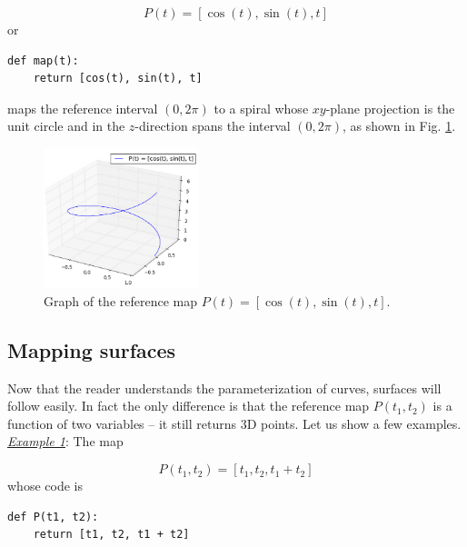 $$
P(t) = [\cos(t), \sin(t), t]
$$
or\\

\begin{bbox}
\begin{verbatim}
def map(t):
    return [cos(t), sin(t), t]
\end{verbatim}
\end{bbox}
\vspace{6mm}

\noindent
maps the reference interval $(0, 2\pi)$ to a spiral whose 
$xy$-plane projection is the unit circle and in the $z$-direction 
spans the interval $(0, 2\pi)$, as shown in Fig. \ref{fig:paramcu4}.

\begin{figure}[!ht]
\begin{center}
\includegraphics[width=0.4\textwidth]{img/paramcu4.png}
\end{center}
\vspace{-6mm}
\caption{Graph of the reference map $P(t) = [\cos(t), \sin(t), t]$.}
\label{fig:paramcu4}
\end{figure}
\noindent

\subsection{Mapping surfaces}

Now that the reader understands the parameterization of curves, surfaces will 
follow easily. In fact the only difference is that the reference map 
$P(t_1, t_2)$ is a function of two variables -- it still returns 3D points. 
Let us show a few examples.\\

\noindent
\underline{\em Example 1}: The map

$$
P(t_1, t_2) = [t_1, t_2, t_1 + t_2]
$$
\noindent
whose code is\\

\begin{bbox}
\begin{verbatim}
def P(t1, t2):
    return [t1, t2, t1 + t2]
\end{verbatim}
\end{bbox}
\vspace{6mm}

